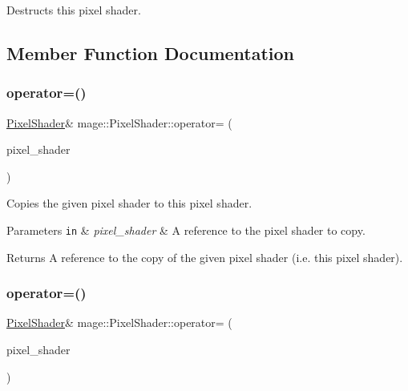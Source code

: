 Destructs this pixel shader. 

\subsection{Member Function Documentation}
\hypertarget{classmage_1_1_pixel_shader_ac3a3535b2751237f4aad110dca05d0c3}{}\label{classmage_1_1_pixel_shader_ac3a3535b2751237f4aad110dca05d0c3} 
\subsubsection{\texorpdfstring{operator=()}{operator=()}\hspace{0.1cm}{\footnotesize\ttfamily [1/2]}}
{\footnotesize\ttfamily \hyperlink{classmage_1_1_pixel_shader}{Pixel\+Shader}\& mage\+::\+Pixel\+Shader\+::operator= (\begin{DoxyParamCaption}\item[{const \hyperlink{classmage_1_1_pixel_shader}{Pixel\+Shader} \&}]{pixel\+\_\+shader }\end{DoxyParamCaption})\hspace{0.3cm}{\ttfamily [delete]}}

Copies the given pixel shader to this pixel shader.


\begin{DoxyParams}[1]{Parameters}
\mbox{\tt in}  & {\em pixel\+\_\+shader} & A reference to the pixel shader to copy. \\
\hline
\end{DoxyParams}
\begin{DoxyReturn}{Returns}
A reference to the copy of the given pixel shader (i.\+e. this pixel shader). 
\end{DoxyReturn}
\hypertarget{classmage_1_1_pixel_shader_aaeab6f6fda7d6e1f7d333da03d58daf9}{}\label{classmage_1_1_pixel_shader_aaeab6f6fda7d6e1f7d333da03d58daf9} 
\subsubsection{\texorpdfstring{operator=()}{operator=()}\hspace{0.1cm}{\footnotesize\ttfamily [2/2]}}
{\footnotesize\ttfamily \hyperlink{classmage_1_1_pixel_shader}{Pixel\+Shader}\& mage\+::\+Pixel\+Shader\+::operator= (\begin{DoxyParamCaption}\item[{\hyperlink{classmage_1_1_pixel_shader}{Pixel\+Shader} \&\&}]{pixel\+\_\+shader }\end{DoxyParamCaption})\hspace{0.3cm}{\ttfamily [delete]}}

